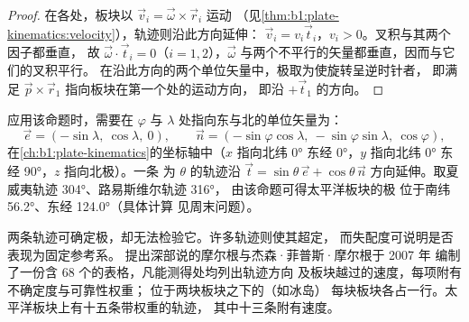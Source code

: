 \begin{proof}
在各处，板块以 $\vec v_i = \vec\omega\times\vec r_i$ 运动
（见\cref{thm:b1:plate-kinematics:velocity}），轨迹则沿此方向延伸：
$\vec v_i = v_i\vec t_i$，$v_i > 0$。叉积与其两个因子都垂直，
故 $\vec\omega\cdot\vec t_i = 0$（$i = 1, 2$），$\vec\omega$
与两个不平行的矢量都垂直，因而与它们的叉积平行。
在沿此方向的两个单位矢量中，极取为使旋转呈逆时针者，
即满足
$\vec p\times\vec r_1$ 指向板块在第一个处的运动方向，
即沿 $+\vec t_1$ 的方向。
\end{proof}

应用该命题时，需要在 $\varphi$ 与
$\lambda$ 处指向东与北的单位矢量为：
\[
  \vec e = (-\sin\lambda,\ \cos\lambda,\ 0),\qquad
  \vec n = (-\sin\varphi\cos\lambda,\ -\sin\varphi\sin\lambda,\ \cos\varphi),
\]
在\cref{ch:b1:plate-kinematics}的坐标轴中（$x$ 指向北纬 \ang{0}
东经 \ang{0}，$y$ 指向北纬 \ang{0} 东经 \ang{90}，$z$ 指向北极）。一条
为 $\theta$ 的轨迹沿 $\vec t = \sin\theta\,\vec e +
\cos\theta\,\vec n$ 方向延伸。取夏威夷轨迹 \ang{304}、路易斯维尔轨迹 \ang{316}，
由该命题可得太平洋板块的极
位于南纬 \ang{56.2}、东经 \ang{124.0}（具体计算
见周末问题）。

两条轨迹可确定极，却无法检验它。许多轨迹则使其超定，
而失配度可说明是否表现为固定参考系。
提出深部说的摩尔根与杰森·菲普斯·摩尔根于 2007 年
编制了一份含 68 个的表格，凡能测得处均列出轨迹方向
及板块越过的速度，每项附有不确定度与可靠性权重；
位于两块板块之下的（如冰岛）
每块板块各占一行。太平洋板块上有十五条带权重的轨迹，
其中十三条附有速度。


